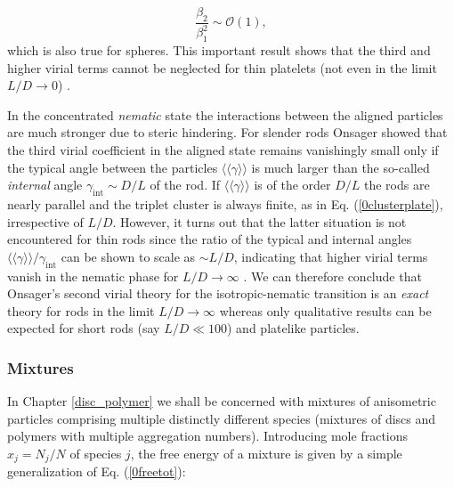 {\begin{equation}
\frac{\beta_{2}}{\beta_{1}^{2}}\sim \mathcal{O}(1), \label{0clusterplate}
\end{equation}
which is also true for spheres. This important result shows that the third and higher virial terms cannot be neglected for thin platelets (not even in the limit $L/D\rightarrow 0$) \cite{Veerman}.

In the concentrated {\em nematic} state the interactions between the aligned particles are much stronger due to steric hindering. For slender rods Onsager showed that the third virial coefficient in the aligned state remains vanishingly small  only if the typical angle between the particles $\langle\langle \gamma \rangle\rangle $ is much larger than the so-called {\em internal} angle $\gamma_{\text{int}}\sim D/L$ of the rod. If $\langle\langle \gamma \rangle\rangle$ is of the order $D/L$ the rods are nearly parallel and the triplet cluster is always finite, as in Eq. (\ref{0clusterplate}), irrespective of $L/D$. However, it turns out that the latter situation is not encountered for thin rods since the ratio of the typical and internal angles $\langle\langle \gamma \rangle\rangle /\gamma_{\text{int}}$  can be shown to scale as $\sim L/D$, indicating that higher virial terms vanish in the nematic phase  for $L/D\rightarrow \infty$ \cite{Vroege92}. We can therefore conclude that  Onsager's  second virial theory for the isotropic-nematic transition is an {\em exact} theory for rods in the limit $L/D \rightarrow \infty$ whereas  only qualitative results can be expected for short rods (say $L/D\ll 100$) and  platelike particles.

\subsubsection{Mixtures}

In Chapter \ref{disc_polymer} we shall be concerned with mixtures of anisometric particles comprising multiple distinctly different species (mixtures of discs and polymers with multiple aggregation numbers). Introducing  mole fractions $x_{j}=N_{j}/N$ of species $j$,  the free energy of a mixture is given by a simple generalization of Eq. (\ref{0freetot}):

}
